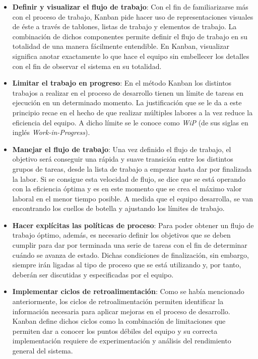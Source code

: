 \begin{itemize}
    \item \textbf{Definir y visualizar el flujo de trabajo}: %
    Con el fin de familiarizarse más con el proceso de trabajo, Kanban pide
    hacer uso de representaciones visuales de éste a través de tablones, listas
    de trabajo y elementos de trabajo. La combinación de dichos componentes
    permite definir el flujo de trabajo en su totalidad de una manera fácilmente
    entendible. En Kanban, visualizar significa anotar exactamente lo que hace
    el equipo sin embellecer los detalles con el fin de observar el sistema en
    su totalidad.

    \item \textbf{Limitar el trabajo en progreso}: %
    En el método Kanban los distintos trabajos a realizar en el proceso de
    desarrollo tienen un límite de tareas en ejecución en un determinado
    momento. La justificación que se le da a este principio recae en el hecho de
    que realizar múltiples labores a la vez reduce la eficiencia del equipo. A
    dicho límite se le conoce como \emph{WiP} (de sus siglas en inglés
    \emph{Work-in-Progress}).

    \item \textbf{Manejar el flujo de trabajo}: %
    Una vez definido el flujo de trabajo, el objetivo será conseguir una rápida
    y suave transición entre los distintos grupos de tareas, desde la lista de
    trabajo a empezar hasta dar por finalizada la labor. Si se consigue esta
    velocidad de flujo, se dice que se está operando con la eficiencia óptima y
    es en este momento que se crea el máximo valor laboral en el menor tiempo
    posible. A medida que el equipo desarrolla, se van encontrando los cuellos
    de botella y ajustando los límites de trabajo.

    \item \textbf{Hacer explícitas las políticas de proceso}: %
    Para poder obtener un flujo de trabajo óptimo, además, es necesario definir
    los objetivos que se deben cumplir para dar por terminada una serie de
    tareas con el fin de determinar cuándo se avanza de estado. Dichas
    condiciones de finalización, sin embargo, siempre irán ligadas al tipo de
    proceso que se está utilizando y, por tanto, deberán ser discutidas y
    especificadas por el equipo.

    \item \textbf{Implementar ciclos de retroalimentación}: %
    Como se había mencionado anteriormente, los ciclos de retroalimentación
    permiten identificar la información necesaria para aplicar mejoras en el
    proceso de desarrollo. Kanban define dichos ciclos como la combinación de
    limitaciones que permiten dar a conocer los puntos débiles del equipo y su
    correcta implementación requiere de experimentación y análisis del
    rendimiento general del sistema.


\end{itemize}
